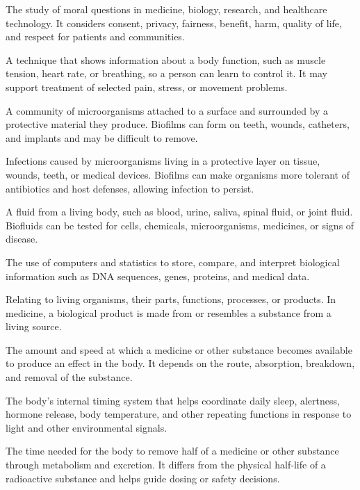  The study of moral questions in medicine, biology, research, and healthcare technology. It considers consent, privacy, fairness, benefit, harm, quality of life, and respect for patients and communities.

 A technique that shows information about a body function, such as muscle tension, heart rate, or breathing, so a person can learn to control it. It may support treatment of selected pain, stress, or movement problems.

 A community of microorganisms attached to a surface and surrounded by a protective material they produce. Biofilms can form on teeth, wounds, catheters, and implants and may be difficult to remove.

 Infections caused by microorganisms
living in a protective layer on tissue, wounds, teeth, or medical devices.
Biofilms can make organisms more tolerant of antibiotics and host defenses,
allowing infection to persist.

 A fluid from a living body, such as blood, urine, saliva, spinal fluid, or joint fluid. Biofluids can be tested for cells, chemicals, microorganisms, medicines, or signs of disease.

 The use of computers and statistics to store, compare, and interpret biological information such as DNA sequences, genes, proteins, and medical data.

 Relating to living organisms, their parts, functions, processes, or products. In medicine, a biological product is made from or resembles a substance from a living source.

 The amount and speed at which a medicine or other substance becomes available to produce an effect in the body. It depends on the route, absorption, breakdown, and removal of the substance.

 The body's internal timing system that helps coordinate daily sleep, alertness, hormone release, body temperature, and other repeating functions in response to light and other environmental signals.

 The time needed for the body to remove half of a medicine or other substance through metabolism and excretion. It differs from the physical half-life of a radioactive substance and helps guide dosing or safety decisions.


